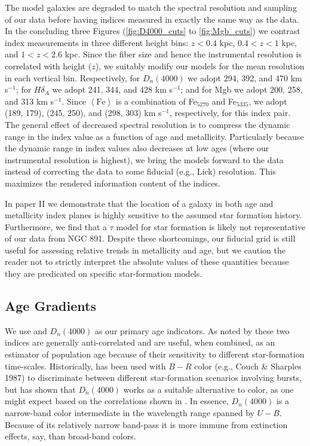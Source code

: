 The model galaxies are degraded to match the spectral resolution and
sampling of our \GP data before having indices measured in exactly the
same way as the data. In the concluding three Figures
(\ref{fig:D4000_cuts} to \ref{fig:Mgb_cuts}) we contrast index
measurements in three different height bins: $z<0.4$ kpc, $0.4<z<1$
kpc, and $1<z<2.6$ kpc. Since the fiber size and hence the
instrumental resolution is correlated with height ($z$), we suitably
modify our models for the mean resolution in each vertical
bin. Respectively, for $D_n(4000)$ we adopt 294, 392, and 470 km
s$^{-1}$; for $H\delta_A$ we adopt 241, 344, and 428 km s$^{-1}$;
and for Mgb we adopt 200, 258, and 313 km s$^{-1}$. Since
$\left<\mathrm{Fe}\right>$ is a combination of Fe$_{5270}$ and
Fe$_{5335}$, we adopt (189, 179), (245, 250), and (298, 303) km
s$^{-1}$, respectively, for this index pair.  The general effect of
decreased spectral resolution is to compress the dynamic range in the
index value as a function of age and metallicity. Particularly because
the dynamic range in index values also decreases at low ages (where
our instrumental resolution is highest), we bring the models forward
to the data instead of correcting the data to some fiducial (e.g.,
Lick) resolution. This maximizes the rendered information content of
the indices.

In paper II we demonstrate that the location of a galaxy in both age
and metallicity index planes is highly sensitive to the assumed star
formation history. Furthermore, we find that a $\tau$ model for star
formation is likely not representative of our data from NGC
891. Despite these shortcomings, our fiducial grid is still useful for
assessing relative trends in metallicity and age, but we caution the
reader not to strictly interpret the absolute values of these
quantities because they are predicated on specific star-formation
models. 

\subsection{Age Gradients}
\label{891_1:sec:age_grad}

We use \Hda and $D_n(4000)$ as our primary age indicators. As noted by
\citet{Hamilton85} these two indices are generally anti-correlated and
are useful, when combined, as an estimator of population age because
of their sensitivity to different star-formation time-scales.
Historically, \Hda has been used with $B-R$ color (e.g., Couch \&
Sharples 1987) to discriminate between different star-formation
scenarios involving bursts, but \citet{Balogh99} has shown that
$D_n(4000)$ works as a suitable alternative to color, as one might
expect based on the correlations shown in \citet{Hamilton85}. In
essence, $D_n(4000)$ is a narrow-band color intermediate in the
wavelength range spanned by $U-B$. Because of its relatively narrow
band-pass it is more immune from extinction effects, say, than
broad-band colors.

